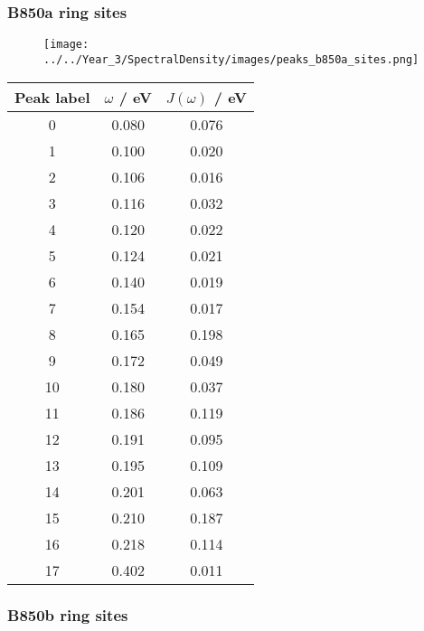 \afterpartskip
\subsubsection{B850a ring sites}
\label{subsubsec:specdens_b850a}

\begin{figure}
    \centering
    \texttt{[image: ../../Year\_3/SpectralDensity/images/peaks\_b850a\_sites.png]}
\end{figure}

\begin{table}
    \centering
    \begin{tabular}{||c c c||}
    \hline
    Peak label & $\omega$ / eV & $J\left(\omega\right)$ / eV \\
    \hline\hline
    
     0 & 0.080 & 0.076 \\
     1 & 0.100 & 0.020 \\
     2 & 0.106 & 0.016 \\
     3 & 0.116 & 0.032 \\
     4 & 0.120 & 0.022 \\
     5 & 0.124 & 0.021 \\
     6 & 0.140 & 0.019 \\
     7 & 0.154 & 0.017 \\
     8 & 0.165 & 0.198 \\
     9 & 0.172 & 0.049 \\
     10 & 0.180 & 0.037 \\
     11 & 0.186 & 0.119 \\
     12 & 0.191 & 0.095 \\
     13 & 0.195 & 0.109 \\
     14 & 0.201 & 0.063 \\
     15 & 0.210 & 0.187 \\
     16 & 0.218 & 0.114 \\
     17 & 0.402 & 0.011 \\
    \hline 
    \end{tabular}
\end{table}


\afterpartskip
\subsubsection{B850b ring sites}
\label{subsubsec:specdens_b850b}


